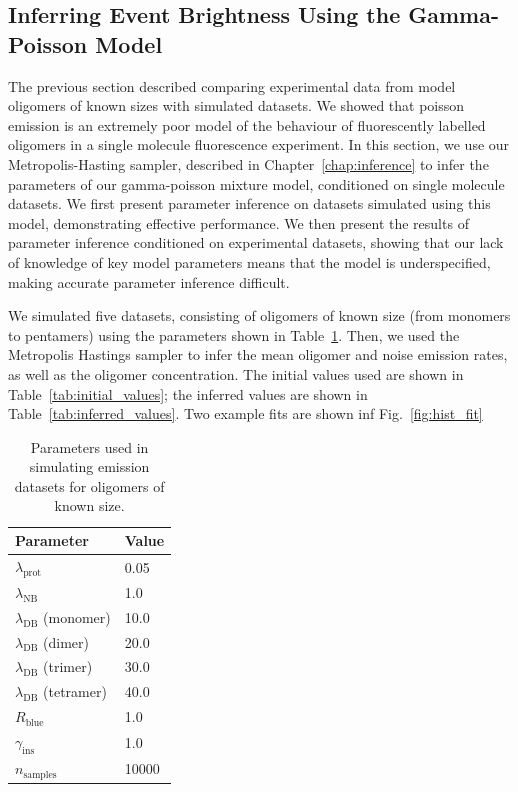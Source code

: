 \subsection{Inferring Event Brightness Using the Gamma-Poisson Model}
The previous section described comparing experimental data from model oligomers of known sizes with simulated datasets. We showed that poisson emission is an extremely poor model of the behaviour of fluorescently labelled oligomers in a single molecule fluorescence experiment. In this section, we use our Metropolis-Hasting sampler, described in Chapter~\autoref{chap:inference} to infer the parameters of our gamma-poisson mixture model, conditioned on single molecule datasets. We first present parameter inference on datasets simulated using this model, demonstrating effective performance. We then present the results of parameter inference conditioned on experimental datasets, showing that our lack of knowledge of key model parameters means that the model is underspecified, making accurate parameter inference difficult.

We simulated five datasets, consisting of oligomers of known size (from monomers to pentamers) using the parameters shown in Table~\ref{tab:oligomer_params}. Then, we used the Metropolis Hastings sampler to infer the mean oligomer and noise emission rates, as well as the oligomer concentration. The initial values used are shown in Table~\ref{tab:initial_values}; the inferred values are shown in Table~\ref{tab:inferred_values}. Two example fits are shown inf Fig.~\ref{fig:hist_fit}

\begin{center}
\begin{table}[!ht]
\begin{tabular}{|l|l|}
\hline
{\bf Parameter} & {\bf Value}\\ \hline
$\lambda_{\text{prot}}$ & 0.05\\
$\lambda_{\text{NB}}$ & 1.0\\
$\lambda_{\text{DB}}$ (monomer) & 10.0\\
$\lambda_{\text{DB}}$ (dimer) & 20.0\\
$\lambda_{\text{DB}}$ (trimer) & 30.0\\
$\lambda_{\text{DB}}$ (tetramer) & 40.0\\
$R_{\text{blue}}$ & 1.0\\
$\gamma_{\text{ins}}$ & 1.0\\
$n_{\text{samples}}$ & 10000\\ \hline
\end{tabular}
\caption{Parameters used in simulating emission datasets for oligomers of known size.}
\label{tab:oligomer_params}
\end{table}
\end{center}

